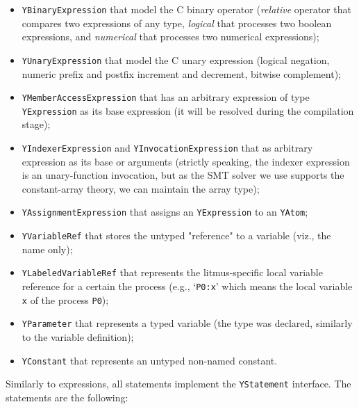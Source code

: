 \begin{itemize}%
  \item \texttt{YBinaryExpression} that model the C binary operator (\textit{relative} operator that compares two expressions of any type, \textit{logical} that processes two boolean expressions, and \textit{numerical} that processes two numerical expressions);

  \item \texttt{YUnaryExpression} that model the C unary expression (logical negation, numeric prefix and postfix increment and decrement, bitwise complement);

  \item \texttt{YMemberAccessExpression} that has an arbitrary expression of type \texttt{YExpression} as its base expression (it will be resolved during the compilation stage);%

  \item \texttt{YIndexerExpression} and \texttt{YInvocationExpression} that as arbitrary expression as its base or arguments (strictly speaking, the indexer expression is an unary-function invocation, but as the SMT solver we use supports the constant-array theory, we can maintain the array type);

  \item \texttt{YAssignmentExpression} that assigns an \texttt{YExpression} to an \texttt{YAtom};

  \item \texttt{YVariableRef} that stores the untyped "reference" to a variable (viz., the name only);

  \item \texttt{YLabeledVariableRef} that represents the litmus-specific local variable reference for a certain the process (e.g., `\lstinline{P0:x}' which means the local variable \lstinline{x} of the process \lstinline{P0});

  \item \texttt{YParameter} that represents a typed variable (the type was declared, similarly to the variable definition);

  \item \texttt{YConstant} that represents an untyped non-named constant.
\end{itemize}

Similarly to expressions, all \ytree{} statements implement the \texttt{YStatement} interface. The statements are the following: 

